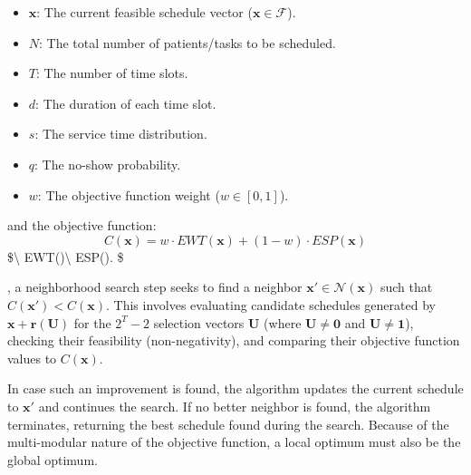 \documentclass[
  letterpaper,
  DIV=11,
  numbers=noendperiod]{scrartcl}
\begin{document}
\begin{itemize}
\item
  \(\mathbf{x}\): The current feasible schedule vector
  (\(\mathbf{x} \in \mathcal{F}\)).
\item
  \(N\): The total number of patients/tasks to be scheduled.
\item
  \(T\): The number of time slots.
\item
  \(d\): The duration of each time slot.
\item
  \(s\): The service time distribution.
\item
  \(q\): The no-show probability.
\item
  \(w\): The objective function weight (\(w \in [0, 1]\)).
\end{itemize}

and the objective function:
\[ C(\mathbf{x}) = w \cdot EWT(\mathbf{x}) + (1-w) \cdot ESP(\mathbf{x}) \]
\$\textbackslash{}
EWT()\textbackslash{}
ESP().
\$

, a neighborhood search step seeks to find a neighbor
\(\mathbf{x}' \in \mathcal{N}(\mathbf{x})\) such that
\(C(\mathbf{x}') < C(\mathbf{x})\). This involves evaluating candidate
schedules generated by \(\mathbf{x} + \mathbf{r}(\mathbf{U})\) for the
\(2^T - 2\) selection vectors \(\mathbf{U}\) (where
\(\mathbf{U} \neq \mathbf{0}\) and \(\mathbf{U} \neq \mathbf{1}\)),
checking their feasibility (non-negativity), and comparing their
objective function values to \(C(\mathbf{x})\).

In case such an improvement is found, the algorithm updates the current
schedule to \(\mathbf{x}'\) and continues the search. If no better
neighbor is found, the algorithm terminates, returning the best schedule
found during the search. Because of the multi-modular nature of the
objective function, a local optimum must also be the global optimum.
\end{document}
